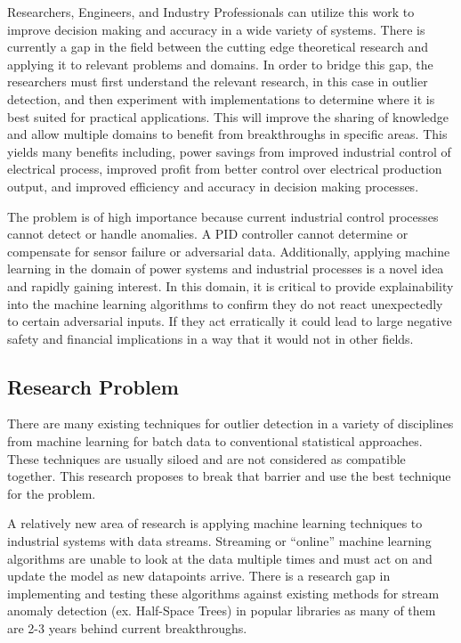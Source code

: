 Researchers, Engineers, and Industry Professionals can utilize this work to improve decision making and accuracy in a wide variety of systems. There is currently a gap in the field between the cutting edge theoretical research and applying it to relevant problems and domains. In order to bridge this gap, the researchers must first understand the relevant research, in this case in outlier detection, and then experiment with implementations to determine where it is best suited for practical applications. This will improve the sharing of knowledge and allow multiple domains to benefit from breakthroughs in specific areas. This yields many benefits including, power savings from improved industrial control of electrical process, improved profit from better control over electrical production output, and improved efficiency and accuracy in decision making processes.

The problem is of high importance because current industrial control processes cannot detect or handle anomalies. A PID controller cannot determine or compensate for sensor failure or adversarial data. Additionally, applying machine learning in the domain of power systems and industrial processes is a novel idea and rapidly gaining interest. In this domain, it is critical to provide explainability into the machine learning algorithms to confirm they do not react unexpectedly to certain adversarial inputs. If they act erratically it could lead to large negative safety and financial implications in a way that it would not in other fields.


\subsection{Research Problem}

There are many existing techniques for outlier detection in a variety of disciplines from machine learning for batch data to conventional statistical approaches. These techniques are usually siloed and are not considered as compatible together. This research proposes to break that barrier and use the best technique for the problem.

A relatively new area of research is applying machine learning techniques to industrial systems with data streams. Streaming or “online” machine learning algorithms are unable to look at the data multiple times and must act on and update the model as new datapoints arrive. There is a research gap in implementing and testing these algorithms against existing methods for stream anomaly detection (ex. Half-Space Trees) in popular libraries as many of them are 2-3 years behind current breakthroughs.

